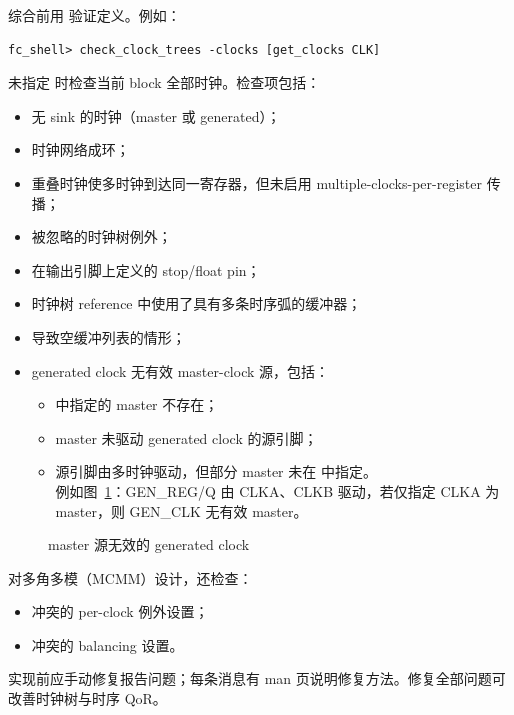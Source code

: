 综合前用  验证定义。例如：
\begin{lstlisting}
fc_shell> check_clock_trees -clocks [get_clocks CLK]
\end{lstlisting}
未指定  时检查当前 block 全部时钟。检查项包括：
\begin{itemize}
  \item 无 sink 的时钟（master 或 generated）；
  \item 时钟网络成环；
  \item 重叠时钟使多时钟到达同一寄存器，但未启用 multiple-clocks-per-register 传播；
  \item 被忽略的时钟树例外；
  \item 在输出引脚上定义的 stop/float pin；
  \item 时钟树 reference 中使用了具有多条时序弧的缓冲器；
  \item 导致空缓冲列表的情形；
  \item generated clock 无有效 master-clock 源，包括：
        \begin{itemize}
          \item {} 中指定的 master 不存在；
          \item master 未驱动 generated clock 的源引脚；
          \item 源引脚由多时钟驱动，但部分 master 未在  中指定。\\
                例如图~\ref{fig:cts-invalid-master}：GEN\_REG/Q 由 CLKA、CLKB 驱动，若仅指定 CLKA 为 master，则 GEN\_CLK 无有效 master。
        \end{itemize}
\end{itemize}

\begin{figure}[htbp]
\centering
{}
\caption{master 源无效的 generated clock}
\label{fig:cts-invalid-master}
\end{figure}

对多角多模（MCMM）设计，还检查：
\begin{itemize}
  \item 冲突的 per-clock 例外设置；
  \item 冲突的 balancing 设置。
\end{itemize}
实现前应手动修复报告问题；每条消息有 man 页说明修复方法。修复全部问题可改善时钟树与时序 QoR。

